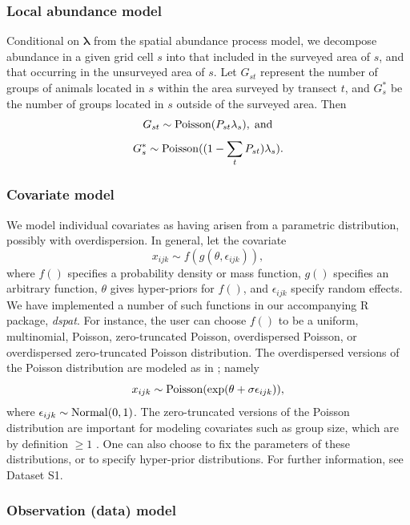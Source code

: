 \documentclass[10pt]{article}
\begin{document}
\subsubsection*{Local abundance model}
Conditional on $\boldsymbol{\lambda}$ from the spatial abundance process model, we decompose abundance in a given grid cell $s$ into that included in the surveyed area of $s$, and that occurring in the unsurveyed area of $s$.  Let $G_{st}$ represent the number of groups of animals located in $s$ within the area surveyed by transect $t$, and $G_s^*$ be the number of groups located in $s$ outside of the surveyed area.  Then
$$
  G_{st} \sim {\rm Poisson}(P_{st} \lambda_s), \hspace{1mm} {\rm and}
$$
$$
  G_s^* \sim {\rm Poisson}((1-\sum_t P_{st}) \lambda_s).
$$

\subsubsection*{Covariate model}

We model individual covariates as having arisen from a parametric distribution, possibly with overdispersion.  In general, let the covariate
\begin{equation} \label{eq:cov.dist}
x_{ijk} \sim f(g(\theta,\epsilon_{ijk})),
\end{equation}
where $f()$ specifies a probability density or mass function, $g()$ specifies an arbitrary function, $\theta$ gives hyper-priors for $f()$, and $\epsilon_{ijk}$ specify random effects.  We have implemented a number of such functions in our accompanying R package, \emph{dspat}.  For instance, the user can choose $f()$ to be a uniform, multinomial, Poisson, zero-truncated Poisson, overdispersed Poisson, or overdispersed zero-truncated Poisson distribution.  The overdispersed versions of the Poisson distribution are modeled as in \cite{McClintockEtAl2009}; namely
$$
x_{ijk} \sim {\rm Poisson}(\exp(\theta+\sigma \epsilon_{ijk})),
$$
where $\epsilon_{ijk} \sim {\rm Normal}(0,1)$.
The zero-truncated versions of the Poisson distribution are important for modeling covariates such as group size, which are by definition $\ge 1$ \cite{Royle2008}.
One can also choose to fix the parameters of these distributions, or to specify hyper-prior distributions.  For further information, see Dataset S1.

\subsubsection*{Observation (data) model}
\end{document}
